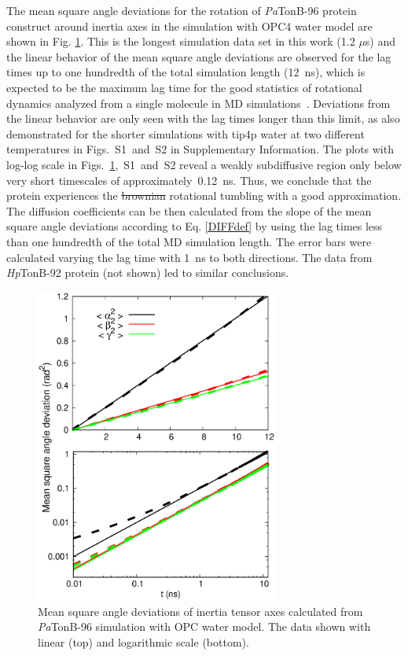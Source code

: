 \documentclass[journal=jpcbfk,manuscript=article]{achemso}
\providecommand{\DIFadd}[1]{{\protect\color{blue}\uwave{#1}}} %
\providecommand{\DIFdel}[1]{{\protect\color{red}\sout{#1}}}                      %
\providecommand{\DIFaddbegin}{} %
\providecommand{\DIFaddend}{} %
\providecommand{\DIFdelbegin}{} %
\providecommand{\DIFdelend}{} %
\begin{document}
The mean square angle deviations for the rotation of {\it Pa}TonB-96 protein construct
around inertia axes in the simulation with OPC4 water model
are shown in Fig. \ref{RMASDplot}. This is the longest
simulation data set in this work (1.2 $\mu$s) and the
linear behavior of the mean square angle deviations are observed
for the lag times up to one hundredth of the total simulation length (12~ns),
which is expected to be the maximum lag time for the good statistics
of rotational dynamics analyzed from a single molecule in MD simulations~\cite{lu06}.
Deviations from the linear behavior are only seen with the lag times longer
than this limit, as also demonstrated for the shorter simulations
with tip4p water at two different temperatures
in Figs.~S1~and~S2 in Supplementary Information.
The plots with log-log scale in
Figs.~\ref{RMASDplot},~S1~and~S2
reveal a weakly subdiffusive region only below very short timescales
of approximately~0.12~ns. Thus, we conclude that the protein
experiences the \DIFdelbegin \DIFdel{brownian }\DIFdelend \DIFaddbegin \DIFadd{Brownian }\DIFaddend rotational tumbling with  a good approximation.
The diffusion coefficients can be then calculated from the slope of the mean square angle
deviations according to Eq. \ref{DIFFdef} by using the lag times less than
one hundredth of the total MD simulation length.
The error bars were calculated varying the lag time with 1~ns to both directions.
The data from {\it Hp}TonB-92 protein (not shown) led to similar conclusions.
\begin{figure}[htb]
  \includegraphics[width=8.0cm]{../Figs/RMASDplotPsTonBOPC4.eps}%
  \caption{Mean square angle deviations of inertia tensor axes calculated from
    {\it Pa}TonB-96 simulation with OPC water model. The data shown with linear (top) and logarithmic scale (bottom).
    \label{RMASDplot}}%
\end{figure}
\end{document}
